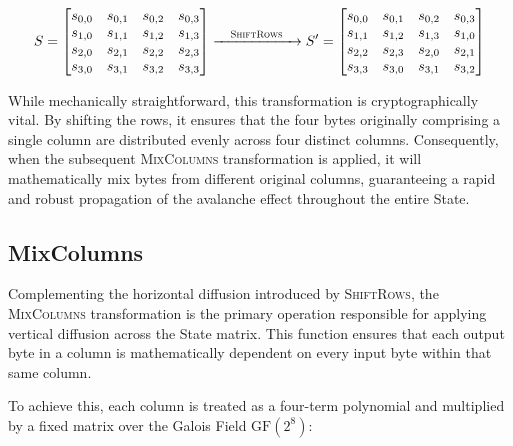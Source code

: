 \documentclass[11pt,a4paper]{report}
\begin{document}
\[
S = \begin{bmatrix}
    s_{0,0} & s_{0,1} & s_{0,2} & s_{0,3} \\
    s_{1,0} & s_{1,1} & s_{1,2} & s_{1,3} \\
    s_{2,0} & s_{2,1} & s_{2,2} & s_{2,3} \\
    s_{3,0} & s_{3,1} & s_{3,2} & s_{3,3}
\end{bmatrix}
\xrightarrow{\quad \textsc{ShiftRows} \quad}
S' = \begin{bmatrix}
    s_{0,0} & s_{0,1} & s_{0,2} & s_{0,3} \\
    s_{1,1} & s_{1,2} & s_{1,3} & s_{1,0} \\
    s_{2,2} & s_{2,3} & s_{2,0} & s_{2,1} \\
    s_{3,3} & s_{3,0} & s_{3,1} & s_{3,2}
\end{bmatrix}
\]

While mechanically straightforward, this transformation is cryptographically vital. By shifting the rows, it ensures that the four bytes originally comprising a single column are distributed evenly across four distinct columns. 
Consequently, when the subsequent \textsc{MixColumns} transformation is applied, it will mathematically mix bytes from different original columns, guaranteeing a rapid and robust propagation of the avalanche effect throughout the entire State.

\subsection{MixColumns}
Complementing the horizontal diffusion introduced by \textsc{ShiftRows}, the \textsc{MixColumns} transformation is the primary operation responsible for applying vertical diffusion across the State matrix. 
This function ensures that each output byte in a column is mathematically dependent on every input byte within that same column.

To achieve this, each column is treated as a four-term polynomial and multiplied by a fixed matrix over the Galois Field $\mathrm{GF}(2^8)$:
\end{document}

